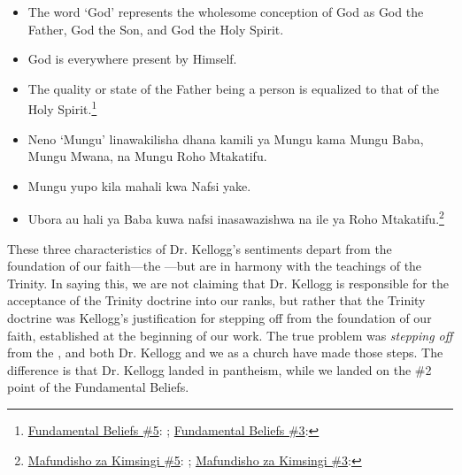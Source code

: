 \begin{itemize}
    \item The word ‘God’ represents the wholesome conception of God as God the Father, God the Son, and God the Holy Spirit.
    \item God is everywhere present by Himself.
    \item The quality or state of the Father being a person is equalized to that of the Holy Spirit.\footnote{\href{https://www.adventist.org/wp-content/uploads/2020/06/ADV-28Beliefs2020.pdf}{Fundamental Beliefs \#5}: ; \href{https://www.adventist.org/wp-content/uploads/2020/06/ADV-28Beliefs2020.pdf}{Fundamental Beliefs \#3}: }
\end{itemize}


\begin{itemize}
    \item Neno ‘Mungu’ linawakilisha dhana kamili ya Mungu kama Mungu Baba, Mungu Mwana, na Mungu Roho Mtakatifu.
    \item Mungu yupo kila mahali kwa Nafsi yake.
    \item Ubora au hali ya Baba kuwa nafsi inasawazishwa na ile ya Roho Mtakatifu.\footnote{\href{https://www.adventist.org/wp-content/uploads/2020/06/ADV-28Beliefs2020.pdf}{Mafundisho za Kimsingi \#5}: ; \href{https://www.adventist.org/wp-content/uploads/2020/06/ADV-28Beliefs2020.pdf}{Mafundisho za Kimsingi \#3}: }
\end{itemize}


These three characteristics of Dr. Kellogg's sentiments depart from the foundation of our faith—the —but are in harmony with the teachings of the Trinity. In saying this, we are not claiming that Dr. Kellogg is responsible for the acceptance of the Trinity doctrine into our ranks, but rather that the Trinity doctrine was Kellogg's justification for stepping off from the foundation of our faith, established at the beginning of our work. The true problem was \textit{stepping off} from the , and both Dr. Kellogg and we as a church have made those steps. The difference is that Dr. Kellogg landed in pantheism, while we landed on the \#2 point of the Fundamental Beliefs.


